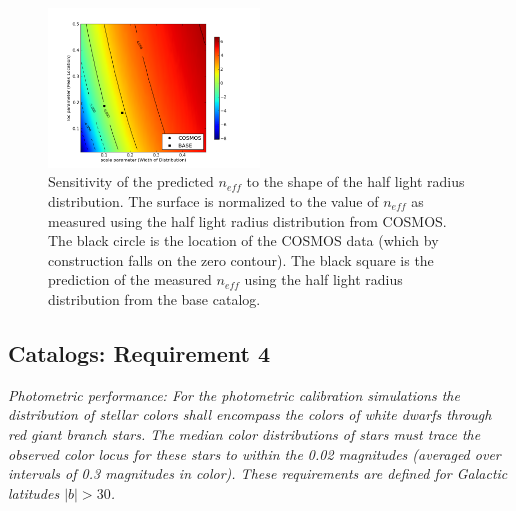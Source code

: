 \documentclass[11pt]{article}
\begin{document}
\begin{figure}[h]
\centering
\includegraphics[width=0.5\textwidth]{validation_figures/size_sensitivity.png}
\caption{Sensitivity of the predicted $n_{eff}$ to the shape of the
  half light radius distribution.  The surface is normalized to the
  value of $n_{eff}$ as measured using the half light radius
  distribution from COSMOS.  The black circle is the location of the
  COSMOS data (which by construction falls on the zero contour).  The
  black square is the prediction of the measured $n_{eff}$ using the
  half light radius distribution from the base
  catalog.\label{fig:size_sens}}
\end{figure}

\subsection{Catalogs: Requirement 4}

{\it Photometric performance: For the photometric calibration
  simulations the distribution of stellar colors shall encompass the
  colors of white dwarfs through red giant branch stars.  The median
  color distributions of stars must trace the observed color locus for
  these stars to within the 0.02 magnitudes (averaged over intervals
  of 0.3 magnitudes in color). These requirements are defined for
  Galactic latitudes $|b|>30$.}\\
\end{document}
